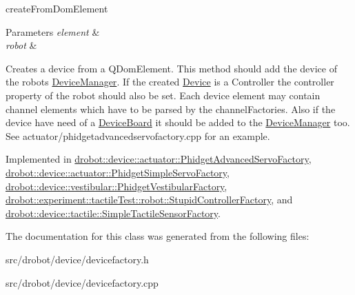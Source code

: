 create\-From\-Dom\-Element 


\begin{DoxyParams}{Parameters}
{\em element} & \\
\hline
{\em robot} & \\
\hline
\end{DoxyParams}
Creates a device from a Q\-Dom\-Element. This method should add the device of the robots \hyperlink{classdrobot_1_1device_1_1DeviceManager}{Device\-Manager}. If the created \hyperlink{classdrobot_1_1device_1_1Device}{Device} is a Controller the controller property of the robot should also be set. Each device element may contain channel elements which have to be parsed by the channel\-Factories. Also if the device have need of a \hyperlink{classdrobot_1_1device_1_1DeviceBoard}{Device\-Board} it should be added to the \hyperlink{classdrobot_1_1device_1_1DeviceManager}{Device\-Manager} too. See actuator/phidgetadvancedservofactory.\-cpp for an example. 

Implemented in \hyperlink{classdrobot_1_1device_1_1actuator_1_1PhidgetAdvancedServoFactory_a05fc8ede82777f4310ac0cf96e705dbe}{drobot\-::device\-::actuator\-::\-Phidget\-Advanced\-Servo\-Factory}, \hyperlink{classdrobot_1_1device_1_1actuator_1_1PhidgetSimpleServoFactory_a30cab321adc5079711b93fc452028736}{drobot\-::device\-::actuator\-::\-Phidget\-Simple\-Servo\-Factory}, \hyperlink{classdrobot_1_1device_1_1vestibular_1_1PhidgetVestibularFactory_ae877ec4a20bcd09fed94f00952b41f7d}{drobot\-::device\-::vestibular\-::\-Phidget\-Vestibular\-Factory}, \hyperlink{classdrobot_1_1experiment_1_1tactileTest_1_1robot_1_1StupidControllerFactory_aa5d84ac226f532590642a76a74e8df96}{drobot\-::experiment\-::tactile\-Test\-::robot\-::\-Stupid\-Controller\-Factory}, and \hyperlink{classdrobot_1_1device_1_1tactile_1_1SimpleTactileSensorFactory_a727416e619c23b25a01818e33f327d6c}{drobot\-::device\-::tactile\-::\-Simple\-Tactile\-Sensor\-Factory}.



The documentation for this class was generated from the following files\-:\begin{DoxyCompactItemize}
\item 
src/drobot/device/devicefactory.\-h\item 
src/drobot/device/devicefactory.\-cpp\end{DoxyCompactItemize}
